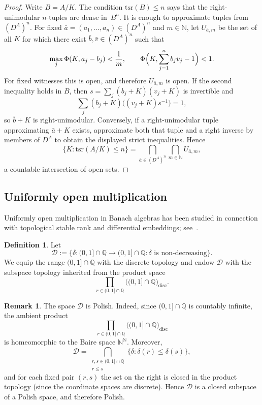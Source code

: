 \documentclass[12pt,fleqn,a4paper]{amsart}
\renewcommand{\le}{\leqslant}
\numberwithin{equation}{section}
\theoremstyle{definition}
\newtheorem{definition}[theorem]{Definition}
\newtheorem{remark}[theorem]{Remark}
\newcommand{\N}{\mathbb{N}}
\newcommand{\Q}{\mathbb{Q}}
\begin{document}
\begin{proof}
Write $B=A/K$.  The condition $\mathrm{tsr}(B)\le n$ says that the right-unimodular
$n$-tuples are dense in~$B^n$.  It is enough to approximate tuples from $(D^A)^n$.
For fixed $\bar a=(a_1,\ldots,a_n)\in(D^A)^n$ and $m\in\N$, let $U_{\bar a,m}$ be
the set of all $K$ for which there exist $\bar b,\bar v\in(D^A)^n$ such that
\[
        \max_j \Phi(K,a_j-b_j)<\frac1m,
        \qquad
        \Phi\Bigl(K,\sum_{j=1}^n b_jv_j-1\Bigr)<1 .
\]
For fixed witnesses this is open, and therefore $U_{\bar a,m}$ is open.  If the second
inequality holds in $B$, then $s=\sum_j(b_j+K)(v_j+K)$ is invertible and
\[
        \sum_j (b_j+K)\bigl((v_j+K)s^{-1}\bigr)=1,
\]
so $\bar b+K$ is right-unimodular.  Conversely, if a right-unimodular tuple
approximating $\bar a+K$ exists, approximate both that tuple and a right inverse by
members of $D^A$ to obtain the displayed strict inequalities.  Hence
\[
        \{K:\mathrm{tsr}(A/K)\le n\}
        =\bigcap_{\bar a\in(D^A)^n}\bigcap_{m\in\N} U_{\bar a,m},
\]
a countable intersection of open sets.
\end{proof}

\subsection{Uniformly open multiplication}

Uniformly open multiplication in Banach algebras has been studied
in connection with topological stable rank and differential
embeddings; see~\cite{DragaKania,KaniaMaslany}.

\begin{definition}\label{def:moduli}
Let
\[
\mathcal D:=\{\delta:(0,1]\cap\Q\to(0,1]\cap\Q:\delta \text{ is non-decreasing}\}.
\]
We equip the range $(0,1]\cap\Q$ with the discrete topology and endow
$\mathcal D$ with the subspace topology inherited from the product space
\[
\prod_{r\in(0,1]\cap\Q}\bigl((0,1]\cap\Q\bigr)_{\mathrm{disc}}.
\]
\end{definition}

\begin{remark}\label{rem:moduli-polish}
The space $\mathcal D$ is Polish.  Indeed, since $(0,1]\cap\Q$ is countably infinite,
the ambient product
\[
\prod_{r\in(0,1]\cap\Q}\bigl((0,1]\cap\Q\bigr)_{\mathrm{disc}}
\]
is homeomorphic to the Baire space $\N^\N$.
Moreover,
\[
\mathcal D=
\bigcap_{\substack{r,s\in(0,1]\cap\Q\\ r\le s}}
\{\delta:\delta(r)\le \delta(s)\},
\]
and for each fixed pair $(r,s)$ the set on the right is closed in the product topology
(since the coordinate spaces are discrete).  Hence $\mathcal D$ is a closed subspace of
a Polish space, and therefore Polish.
\end{remark}
\end{document}
